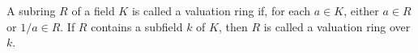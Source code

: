 A subring $R$ of a field $K$ is called a valuation ring if, for each $a \in K$, either $a \in R$ or $1/a \in R$. If $R$ contains a subfield $k$ of $K$, then $R$ is called a valuation ring over $k$.
